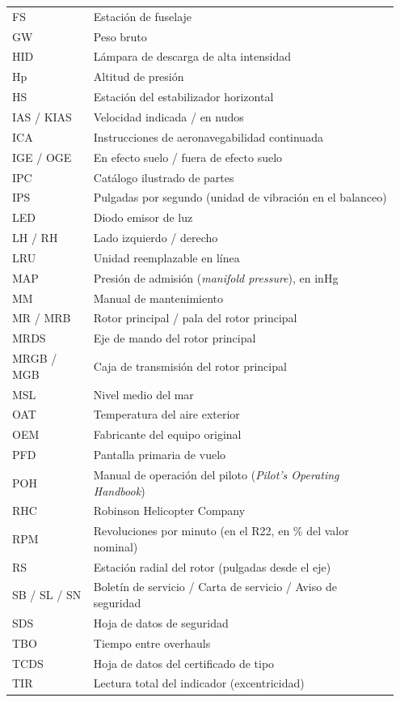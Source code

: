 {\begin{longtable}{@{}>{\raggedright\arraybackslash}p{0.2\linewidth}>{\raggedright\arraybackslash}p{0.75\linewidth}@{}}
FS & Estación de fuselaje \\
GW & Peso bruto \\
HID & Lámpara de descarga de alta intensidad \\
Hp & Altitud de presión \\
HS & Estación del estabilizador horizontal \\
IAS / KIAS & Velocidad indicada / en nudos \\
ICA & Instrucciones de aeronavegabilidad continuada \\
IGE / OGE & En efecto suelo / fuera de efecto suelo \\
IPC & Catálogo ilustrado de partes \\
IPS & Pulgadas por segundo (unidad de vibración en el balanceo) \\
LED & Diodo emisor de luz \\
LH / RH & Lado izquierdo / derecho \\
LRU & Unidad reemplazable en línea \\
MAP & Presión de admisión (\emph{manifold pressure}), en inHg \\
MM & Manual de mantenimiento \\
MR / MRB & Rotor principal / pala del rotor principal \\
MRDS & Eje de mando del rotor principal \\
MRGB / MGB & Caja de transmisión del rotor principal \\
MSL & Nivel medio del mar \\
OAT & Temperatura del aire exterior \\
OEM & Fabricante del equipo original \\
PFD & Pantalla primaria de vuelo \\
POH & Manual de operación del piloto (\emph{Pilot's Operating Handbook}) \\
RHC & Robinson Helicopter Company \\
RPM & Revoluciones por minuto (en el R22, en \% del valor nominal) \\
RS & Estación radial del rotor (pulgadas desde el eje) \\
SB / SL / SN & Boletín de servicio / Carta de servicio / Aviso de seguridad \\
SDS & Hoja de datos de seguridad \\
TBO & Tiempo entre overhauls \\
TCDS & Hoja de datos del certificado de tipo \\
TIR & Lectura total del indicador (excentricidad) \\

\end{longtable}}
